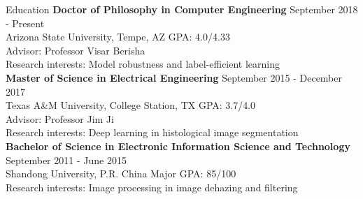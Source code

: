 \documentclass{resume} %
\begin{document}
  

\vspace{-0.5cm}
\begin{rSection}{Education}
{\bf Doctor of Philosophy in Computer Engineering} \hfill {September 2018 - Present}
\\
Arizona State University, Tempe, AZ \hspace{0.1in}GPA: 4.0/4.33\\
Advisor: Professor Visar Berisha\\
Research interests: Model robustness and label-efficient learning \\ 
{\bf Master of Science in Electrical Engineering} \hfill {September 2015 - December 2017}
\\ 
Texas A\&M University, College Station, TX \hspace{0.1in}GPA: 3.7/4.0
\\
Advisor: Professor Jim Ji\\
Research interests: Deep learning in histological image segmentation\\
{\bf Bachelor of Science in Electronic Information Science and Technology} \hfill {September 2011 - June 2015}
\\ 
Shandong University, P.R. China \hspace{0.1in}Major GPA: 85/100\\ 
Research interests:  Image processing in image dehazing and filtering 


\end{rSection} 
\end{document}
